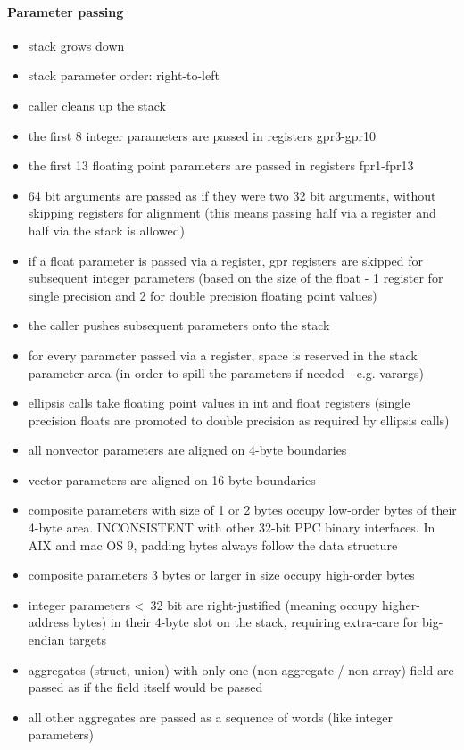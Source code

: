 \paragraph{Parameter passing}

\begin{itemize}
\item stack grows down
\item stack parameter order: right-to-left
\item caller cleans up the stack
\item the first 8 integer parameters are passed in registers gpr3-gpr10
\item the first 13 floating point parameters are passed in registers fpr1-fpr13
\item 64 bit arguments are passed as if they were two 32 bit arguments, without skipping registers for alignment (this means passing half via a register and half via the stack is allowed)
\item if a float parameter is passed via a register, gpr registers are skipped for subsequent integer parameters (based on the size of
the float - 1 register for single precision and 2 for double precision floating point values)
\item the caller pushes subsequent parameters onto the stack
\item for every parameter passed via a register, space is reserved in the stack parameter area (in order to spill the parameters if
needed - e.g. varargs)
\item ellipsis calls take floating point values in int and float registers (single precision floats are promoted to double precision as
required by ellipsis calls)
\item all nonvector parameters are aligned on 4-byte boundaries
\item vector parameters are aligned on 16-byte boundaries
\item composite parameters with size of 1 or 2 bytes occupy low-order bytes of their 4-byte area. INCONSISTENT with other 32-bit PPC
binary interfaces. In AIX and mac OS 9, padding bytes always follow the data structure
\item composite parameters 3 bytes or larger in size occupy high-order bytes
\item integer parameters \textless\ 32 bit are right-justified (meaning occupy higher-address bytes) in their 4-byte slot on the stack, requiring extra-care for big-endian targets
\item aggregates (struct, union) with only one (non-aggregate / non-array) field are passed as if the field itself would be passed
\item all other aggregates are passed as a sequence of words (like integer parameters)
\end{itemize}


